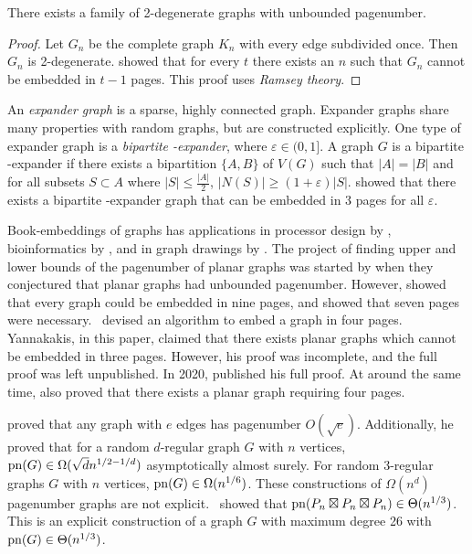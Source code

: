 \begin{theorem}
	There exists a family of 2-degenerate graphs with unbounded pagenumber.
\end{theorem}
\begin{proof}
	Let $G_n$ be the complete graph $K_n$ with every edge subdivided once. Then $G_n$ is 2-degenerate. \textcite{eppsteinSeparatingThicknessGeometric2002} showed that for every $t$ there exists an $n$ such that $G_n$ cannot be embedded in $t-1$ pages. This proof uses \textit{Ramsey theory}.
\end{proof}

An \textit{expander graph} is a sparse, highly connected graph. Expander graphs share many properties with random graphs, but are constructed explicitly. One type of expander graph is a \textit{bipartite \varepsilon-expander}, where $\varepsilon \in (0, 1]$. A graph $G$ is a bipartite \varepsilon-expander if there exists a bipartition $ \{A, B\}$ of $V(G)$ such that $|A| = |B|$ and for all subsets $S \subset A$ where $|S| \leq \frac{|A|}{2}$, $|N(S)| \geq (1 + \varepsilon) |S|$. 
\textcite{dujmovicLayoutsExpanderGraphs2016} showed that there exists a bipartite \varepsilon-expander graph that can be embedded in 3 pages for all $\varepsilon$. 


Book-embeddings of graphs has applications in processor design by \textcite{chungEmbeddingGraphsBooks1987}, bioinformatics by \textcite{haslingerRNAStructuresPseudoknots1999}, and in graph drawings by \textcite{woodBoundedDegreeBook2002}. 
The project of finding upper and lower bounds of the pagenumber of planar graphs was started by \textcite{bernhartBookThicknessGraph1979} when they conjectured that planar graphs had unbounded pagenumber. However, \textcite{bussPagenumberPlanarGraphs1984} showed that every graph could be embedded in nine pages, and \textcite{heathEmbeddingPlanarGraphs1984} showed that seven pages were necessary.\ \textcite{yannakakisEmbeddingPlanarGraphs1989} devised an algorithm to embed a graph in four pages. Yannakakis, in this paper, claimed that there exists planar graphs which cannot be embedded in three pages. However, his proof was incomplete, and the full proof was left unpublished. In 2020, \textcite{yannakakisPlanarGraphsThat2020} published his full proof. At around the same time, \textcite{bekosFourPagesAre2020} also proved that there exists a planar graph requiring four pages.

\textcite{malitzGraphsEdgesHave1994} proved that any graph with $e$ edges has pagenumber $O(\sqrt{e})$. Additionally, he proved that for a random $d$-regular graph $G$ with $n$ vertices, $\operatorname{pn}(G) \in \Omega(\sqrt{d} n^{1/2 - 1/d})$ asymptotically almost surely. For random 3-regular graphs $G$ with $n$ vertices, $\operatorname{pn}(G) \in \Omega(n^{1/6})$. These constructions of $\Omega(n^d)$ pagenumber graphs are not explicit.\ \textcite{eppsteinThreeDimensionalGraphProducts2024} showed that $\operatorname{pn}(P_n \boxtimes P_n \boxtimes P_n) \in \Theta(n^{1/3})$. This is an explicit construction of a graph $G$ with maximum degree 26 with $\operatorname{pn}(G) \in \Theta(n^{1/3})$. 